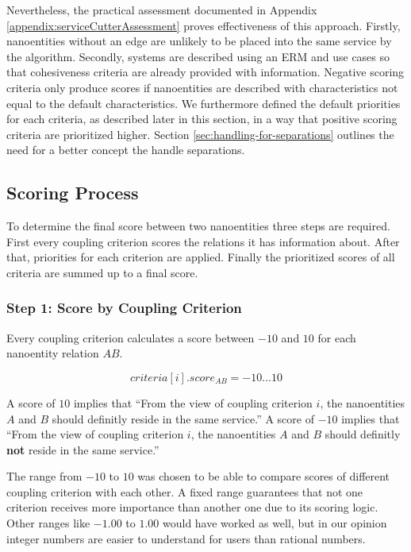 Nevertheless, the practical assessment documented in Appendix \ref{appendix:serviceCutterAssessment} proves effectiveness of this approach. Firstly, nanoentities without an edge are unlikely to be placed into the same service by the algorithm. Secondly, systems are described using an \gls{ERM} and use cases so that cohesiveness criteria are already provided with information. Negative scoring criteria only produce scores if nanoentities are described with characteristics not equal to the default characteristics. We furthermore defined the default priorities for each criteria, as described later in this section, in a way that positive scoring criteria are prioritized higher. Section \ref{sec:handling-for-separations} outlines the need for a better concept the handle separations.

\subsection{Scoring Process}

To determine the final score between two nanoentities three steps are required. First every coupling criterion scores the relations it has information about. After that, priorities for each criterion are applied. Finally the prioritized scores of all criteria are summed up to a final score.

\subsubsection{Step 1: Score by Coupling Criterion}

Every coupling criterion calculates a score between $-10$ and $10$ for each nanoentity relation $AB$. 

\begin{displaymath}
criteria[i].score_{AB} = -10 ... 10
\end{displaymath}

A score of $10$ implies that \enquote{From the view of coupling criterion $i$, the nanoentities $A$ and $B$ should definitly reside in the same service.} A score of $-10$ implies that \enquote{From the view of coupling criterion $i$, the nanoentities $A$ and $B$ should definitly \textbf{not} reside in the same service.} 

The range from $-10$ to  $10$ was chosen to be able to compare scores of different coupling criterion with each other. A fixed range guarantees that not one criterion receives more importance than another one due to its scoring logic. Other ranges like $-1.00$ to $1.00$ would have worked as well, but in our opinion integer numbers are easier to understand for users than rational numbers. 


